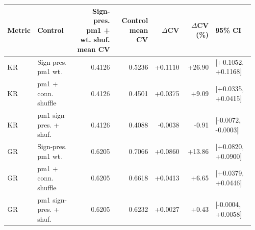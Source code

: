 \begin{tabular}{llrrrrl}
\toprule
Metric & Control & Sign-pres. pm1 + wt. shuf. mean CV & Control mean CV & $\Delta$CV & $\Delta$CV (\%) & 95\% CI \\
\midrule
KR & Sign-pres. pm1 wt. & 0.4126 & 0.5236 & +0.1110 & +26.90 & [+0.1052, +0.1168] \\
KR & pm1 + conn. shuffle & 0.4126 & 0.4501 & +0.0375 & +9.09 & [+0.0335, +0.0415] \\
KR & pm1 sign-pres. + shuf. & 0.4126 & 0.4088 & -0.0038 & -0.91 & [-0.0072, -0.0003] \\
GR & Sign-pres. pm1 wt. & 0.6205 & 0.7066 & +0.0860 & +13.86 & [+0.0820, +0.0900] \\
GR & pm1 + conn. shuffle & 0.6205 & 0.6618 & +0.0413 & +6.65 & [+0.0379, +0.0446] \\
GR & pm1 sign-pres. + shuf. & 0.6205 & 0.6232 & +0.0027 & +0.43 & [-0.0004, +0.0058] \\
\bottomrule
\end{tabular}
